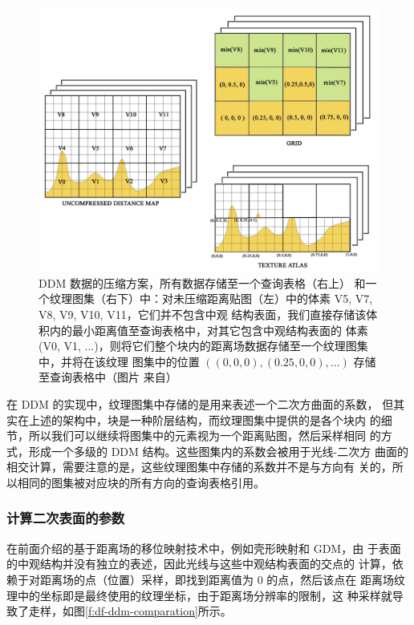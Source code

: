 \begin{figure}
	\includegraphics[width=\textwidth]{figures/df/ddm-compression}
	\caption{DDM 数据的压缩方案，所有数据存储至一个查询表格（右上） 和一个纹理图集（右下）中：对未压缩距离贴图（左）中的体素 V5, V7, V8, V9, V10, V11，它们并不包含中观 结构表面，我们直接存储该体积内的最小距离值至查询表格中，对其它包含中观结构表面的 体素 (V0, V1, ...)，则将它们整个块内的距离场数据存储至一个纹理图集中，并将在该纹理 图集中的位置 $((0,0,0),(0.25,0,0),...)$ 存储至查询表格中（图片 来自\cite{a:directional-distance-maps}）}
	\label{f:df-ddm-compression}
\end{figure}

在 DDM 的实现中，纹理图集中存储的是用来表述一个二次方曲面的系数， 但其实在上述的架构中，块是一种阶层结构，而纹理图集中提供的是各个块内 的细节，所以我们可以继续将图集中的元素视为一个距离贴图，然后采样相同 的方式，形成一个多级的 DDM 结构。这些图集内的系数会被用于光线-二次方 曲面的相交计算，需要注意的是，这些纹理图集中存储的系数并不是与方向有 关的，所以相同的图集被对应块的所有方向的查询表格引用。



\subsubsection{计算二次表面的参数}
在前面介绍的基于距离场的移位映射技术中，例如壳形映射和 GDM，由 于表面的中观结构并没有独立的表述，因此光线与这些中观结构表面的交点的 计算，依赖于对距离场的点（位置）采样，即找到距离值为 0 的点，然后该点在 距离场纹理中的坐标即是最终使用的纹理坐标，由于距离场分辨率的限制，这 种采样就导致了走样，如图\ref{f:df-ddm-comparation}所示。

